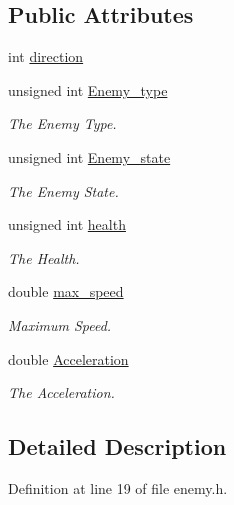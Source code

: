 \subsection*{Public Attributes}
\begin{DoxyCompactItemize}
\item 
int \hyperlink{classc_enemy_a22386b576b01c7ea38ece61f9c87bf11}{direction}
\item 
unsigned int \hyperlink{classc_enemy_a880c1a91dbfe21b21d42dfb4facfd8bd}{Enemy\-\_\-type}
\begin{DoxyCompactList}\small\item\em The Enemy Type. \end{DoxyCompactList}\item 
unsigned int \hyperlink{classc_enemy_a858dd95ac9758be01aaa820745339c50}{Enemy\-\_\-state}
\begin{DoxyCompactList}\small\item\em The Enemy State. \end{DoxyCompactList}\item 
unsigned int \hyperlink{classc_enemy_a7f8cefdb27237e5639bda5136b8cb12f}{health}
\begin{DoxyCompactList}\small\item\em The Health. \end{DoxyCompactList}\item 
double \hyperlink{classc_enemy_a6e2b748e908bbd46d502a1c829c8201b}{max\-\_\-speed}
\begin{DoxyCompactList}\small\item\em Maximum Speed. \end{DoxyCompactList}\item 
double \hyperlink{classc_enemy_a255be2be55e872e5b23764677fbc049d}{Acceleration}
\begin{DoxyCompactList}\small\item\em The Acceleration. \end{DoxyCompactList}\end{DoxyCompactItemize}


\subsection{Detailed Description}


Definition at line 19 of file enemy.\-h.



